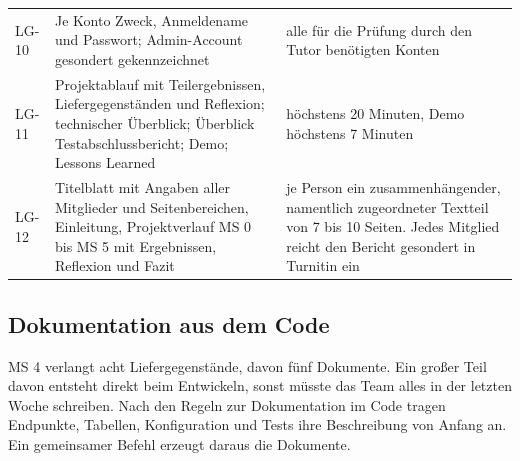\documentclass[11pt,a4paper]{article}
\begin{document}
\begin{tabularx}{\linewidth}{@{}l >{\hsize=1.20\hsize\RaggedRight\arraybackslash}X >{\hsize=0.80\hsize\RaggedRight\arraybackslash}X@{}}
LG-10 & Je Konto Zweck, Anmeldename und Passwort; Admin-Account gesondert gekennzeichnet & alle für die Prüfung durch den Tutor benötigten Konten \\
LG-11 & Projektablauf mit Teilergebnissen, Liefergegenständen und Reflexion; technischer Überblick; Überblick Testabschlussbericht; Demo; Lessons Learned & höchstens 20 Minuten, Demo höchstens 7 Minuten \\
LG-12 & Titelblatt mit Angaben aller Mitglieder und Seitenbereichen, Einleitung, Projektverlauf MS 0 bis MS 5 mit Ergebnissen, Reflexion und Fazit & je Person ein zusammenhängender, namentlich zugeordneter Textteil von 7 bis 10 Seiten. Jedes Mitglied reicht den Bericht gesondert in Turnitin ein \\
\bottomrule
\end{tabularx}

\subsection{Dokumentation aus dem Code}

MS 4 verlangt acht Liefergegenstände, davon fünf Dokumente. Ein großer Teil davon entsteht direkt beim Entwickeln, sonst müsste das Team alles in der letzten Woche schreiben. Nach den Regeln zur Dokumentation im Code tragen Endpunkte, Tabellen, Konfiguration und Tests ihre Beschreibung von Anfang an. Ein gemeinsamer Befehl erzeugt daraus die Dokumente.
\end{document}
